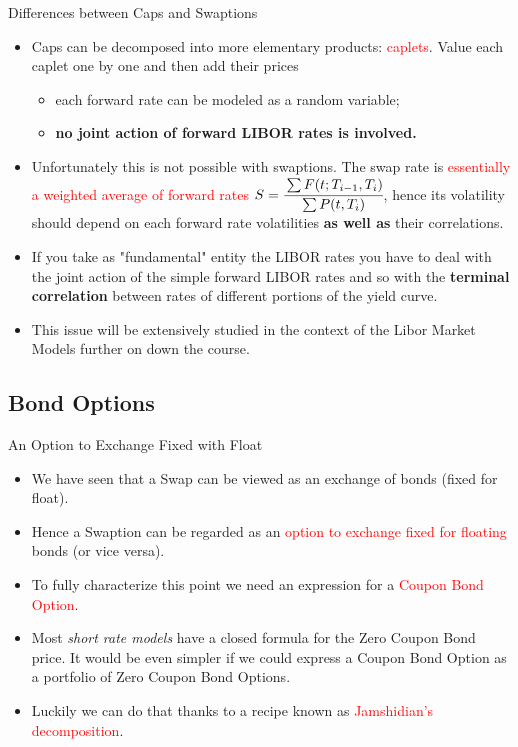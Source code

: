 \documentclass{beamer}
\begin{document}
\begin{frame}{Differences between Caps and Swaptions}
\begin{itemize}
	\item<1-> Caps can be decomposed into more elementary products: \textcolor{red}{caplets}. Value each caplet one by one and then add their prices
	\begin{itemize}
		\item each forward rate can be modeled as a random variable;
		\item \textbf{no joint action of forward LIBOR rates is involved.}
	\end{itemize}
	\item<2-> Unfortunately this is not possible with swaptions. The swap rate is \textcolor{red}{essentially a weighted average of forward rates} $S=\cfrac{\sum F(t;T_{i-1},T_i)}{\sum P(t,T_i)}$, hence its volatility should depend on each forward rate volatilities \textbf{as well as} their correlations.
	\item<4-> If you take as "fundamental" entity the LIBOR rates you have to deal with the joint action of the simple forward LIBOR rates and so with the \textbf{terminal correlation} between rates of different portions of the yield curve. 
	\item This issue will be extensively studied in the context of the Libor Market Models further on down the course.
\end{itemize}
\end{frame}

\subsection{Bond Options}
\begin{frame}{An Option to Exchange Fixed with Float}
\begin{itemize}
	\item<1-> We have seen that a Swap can be viewed as an exchange of bonds (fixed for float).
	\item<2-> Hence a Swaption can be regarded as an \textcolor{red}{option to exchange fixed for floating} bonds (or vice versa).
	\item<3-> To fully characterize this point we need an expression for a \textcolor{red}{Coupon Bond Option}.
	\item <4-> Most \emph{short rate models} have a closed formula for the Zero Coupon Bond price. It would be even simpler if we could express a Coupon Bond Option as a portfolio of Zero Coupon Bond Options.
	\item<5-> Luckily we can do that thanks to a recipe known as \textcolor{red}{Jamshidian's decomposition}.
\end{itemize}
\end{frame}
\end{document}
